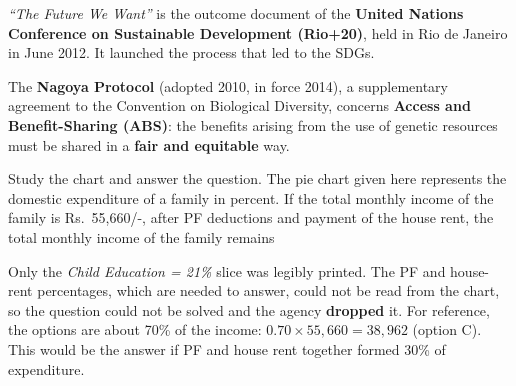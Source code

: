 \emph{``The Future We Want''} is the outcome document of the \textbf{United Nations Conference on Sustainable Development (Rio+20)}, held in Rio de Janeiro in June 2012. It launched the process that led to the SDGs.

The \textbf{Nagoya Protocol} (adopted 2010, in force 2014), a supplementary agreement to the Convention on Biological Diversity, concerns \textbf{Access and Benefit-Sharing (ABS)}: the benefits arising from the use of genetic resources must be shared in a \textbf{fair and equitable} way.

Study the chart and answer the question. The pie chart given here represents the domestic expenditure of a family in percent. If the total monthly income of the family is Rs.~55,660/-, after PF deductions and payment of the house rent, the total monthly income of the family remains


Only the \emph{Child Education = 21\%} slice was legibly printed. The PF and house-rent percentages, which are needed to answer, could not be read from the chart, so the question could not be solved and the agency \textbf{dropped} it.
For reference, the options are about 70\% of the income: $0.70\times55{,}660=38{,}962$ (option C). This would be the answer if PF and house rent together formed 30\% of expenditure.


